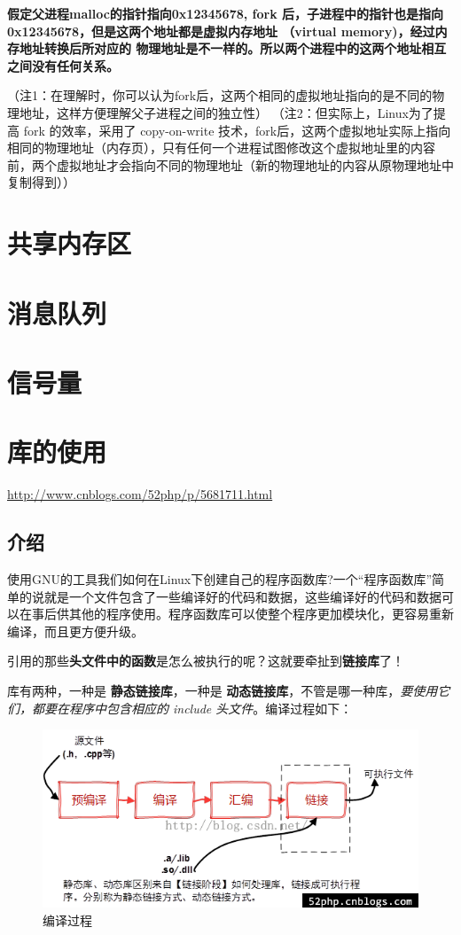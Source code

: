 \documentclass[UTF8,a4paper,12pt]{ctexbook}
\begin{document}
			\textbf{假定父进程malloc的指针指向0x12345678, fork 后，子进程中的指针也是指向0x12345678，但是这两个地址都是虚拟内存地址 （virtual memory)，经过内存地址转换后所对应的 物理地址是不一样的。所以两个进程中的这两个地址相互之间没有任何关系。}
			
			
			（注1：在理解时，你可以认为fork后，这两个相同的虚拟地址指向的是不同的物理地址，这样方便理解父子进程之间的独立性）
			（注2：但实际上，Linux为了提高 fork 的效率，采用了 copy-on-write 技术，fork后，这两个虚拟地址实际上指向相同的物理地址（内存页），只有任何一个进程试图修改这个虚拟地址里的内容前，两个虚拟地址才会指向不同的物理地址（新的物理地址的内容从原物理地址中复制得到））
	\section{共享内存区}
	
	\section{消息队列}
	
	\section{信号量}
	
	\section{库的使用}
		\url{http://www.cnblogs.com/52php/p/5681711.html}
		\subsection{介绍}
			使用GNU的工具我们如何在Linux下创建自己的程序函数库?一个“程序函数库”简单的说就是一个文件包含了一些编译好的代码和数据，这些编译好的代码和数据可以在事后供其他的程序使用。程序函数库可以使整个程序更加模块化，更容易重新编译，而且更方便升级。  
			
			引用的那些\textbf{头文件中的函数}是怎么被执行的呢？这就要牵扯到\textbf{链接库}了！
			
			库有两种，一种是 \textbf{静态链接库}，一种是 \textbf{动态链接库}，不管是哪一种库，\textit{要使用它们，都要在程序中包含相应的 include 头文件}。编译过程如下：
			
			\begin{figure}[h]
				\centering
				\includegraphics[scale = 0.7]{figure/compileProcess.png}
				\caption{编译过程}
			\end{figure}
			
\end{document}

